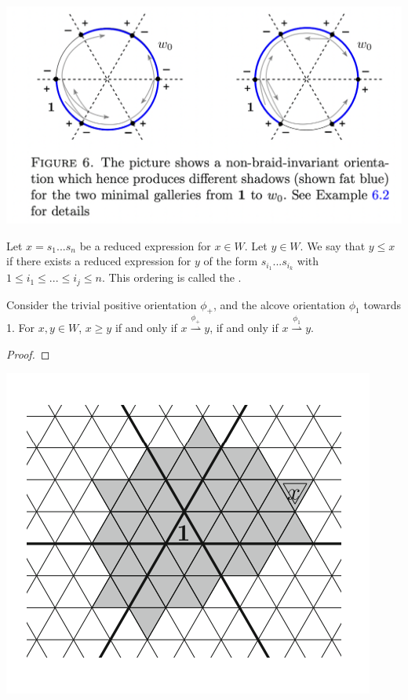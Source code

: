 \documentclass[11pt]{article}
\begin{document}
\includegraphics[scale=0.6]{Screenshot 2023-02-08 at 10.39.18.png}\\

\begin{definition}
    Let $x=s_1...s_n$ be a reduced expression for $x\in W$. Let $y\in W$. We say that $y\leq x$ if there exists a reduced expression for $y$ of the form $s_{i_1}...s_{i_k}$ with $1\leq i_1\leq...\leq i_j\leq n$. This ordering is called the .
\end{definition}

\begin{proposition}
    Consider the trivial positive orientation $\phi_+$, and the alcove orientation $\phi_1$ towards 1. For $x,y\in W$, $x\geq y$ if and only if $x\stackrel{\phi_+}{\rightharpoonup} y$, if and only if $x\stackrel{\phi_1}{\rightharpoonup} y$.
\end{proposition}

\begin{proof}
    
\end{proof}
\bigbreak
\begin{center}
    \includegraphics[scale=1]{Screenshot 2023-03-07 133912.png}\\
\end{center}
\end{document}
